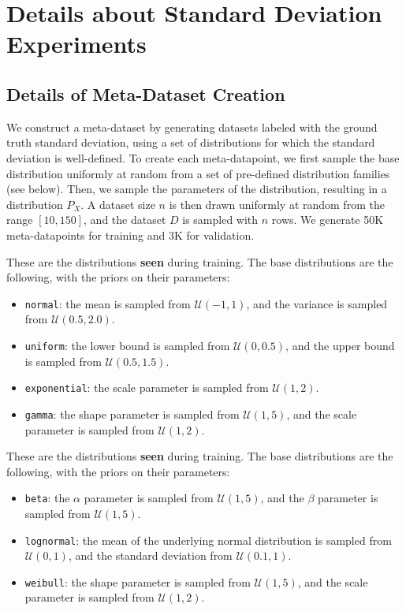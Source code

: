 


\section{Details about Standard Deviation Experiments}
\label{app:std}


\subsection{Details of Meta-Dataset Creation}
We construct a meta-dataset by generating datasets labeled with the ground truth standard deviation, using a set of distributions for which the standard deviation is well-defined. To create each meta-datapoint, we first sample the base distribution uniformly at random from a set of pre-defined distribution families (see below). Then, we sample the parameters of the distribution, resulting in a distribution \(P_X\). A dataset size \(n\) is then drawn uniformly at random from the range \([10, 150]\), and the dataset \(D\) is sampled with \(n\) rows. 
We generate 50K meta-datapoints for training and 3K for validation.

These are the distributions \textbf{seen} during training. The base distributions are the following, with the priors on their parameters:
\begin{itemize}
    \item \texttt{normal}: the mean is sampled from \(\mathcal{U}(-1, 1)\), and the variance is sampled from \(\mathcal{U}(0.5, 2.0)\). 
    \item \texttt{uniform}: the lower bound is sampled from \(\mathcal{U}(0, 0.5)\), and the upper bound is sampled from \(\mathcal{U}(0.5, 1.5)\).
    \item \texttt{exponential}: the scale parameter is sampled from \(\mathcal{U}(1, 2)\).
    \item \texttt{gamma}: the shape parameter is sampled from \(\mathcal{U}(1, 5)\), and the scale parameter is sampled from \(\mathcal{U}(1, 2)\).
\end{itemize}

These are the distributions \textbf{seen} during training. The base distributions are the following, with the priors on their parameters:
\begin{itemize}
    \item \texttt{beta}: the \(\alpha\) parameter is sampled from \(\mathcal{U}(1, 5)\), and the \(\beta\) parameter is sampled from \(\mathcal{U}(1, 5)\).
    \item \texttt{lognormal}: the mean of the underlying normal distribution is sampled from \(\mathcal{U}(0, 1)\), and the standard deviation from \(\mathcal{U}(0.1, 1)\).
    \item \texttt{weibull}: the shape parameter is sampled from \(\mathcal{U}(1, 5)\), and the scale parameter is sampled from \(\mathcal{U}(1, 2)\).
\end{itemize}


